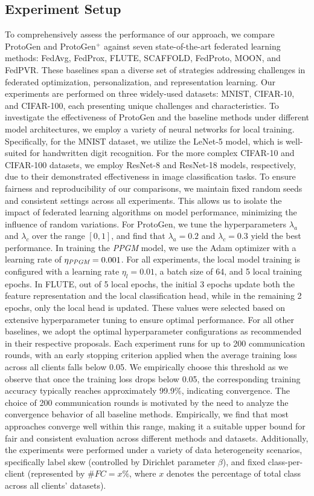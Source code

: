 \documentclass[lettersize,journal]{IEEEtran}
\begin{document}
\subsection{Experiment Setup}

To comprehensively assess the performance of our approach, we compare \textsf{ProtoGen} and \textsf{ProtoGen}$^+$ against seven state-of-the-art federated learning methods: FedAvg, FedProx, FLUTE, SCAFFOLD, FedProto, MOON, and FedPVR. These baselines span a diverse set of strategies addressing challenges in federated optimization, personalization, and representation learning.
Our experiments are performed on three widely-used datasets: MNIST, CIFAR-10, and CIFAR-100, each presenting unique challenges and characteristics. To investigate the effectiveness of \textsf{ProtoGen} and the baseline methods under different model architectures, we employ a variety of neural networks for local training. Specifically, for the MNIST dataset, we utilize the LeNet-5 model, which is well-suited for handwritten digit recognition. For the more complex CIFAR-10 and CIFAR-100 datasets, we employ ResNet-8 and ResNet-18 models, respectively, due to their demonstrated effectiveness in image classification tasks. To ensure fairness and reproducibility of our comparisons, we maintain fixed random seeds and consistent settings across all experiments. This allows us to isolate the impact of federated learning algorithms on model performance, minimizing the influence of random variations. For \textsf{ProtoGen}, we tune the hyperparameters $\lambda_a$ and $\lambda_c$ over the range $[0, 1]$, and find that $\lambda_a = 0.2$ and $\lambda_c = 0.3$ yield the best performance. In training the \emph{PPGM} model, we use the Adam optimizer with a learning rate of $\eta_{\emph{PPGM}} = 0.001$. For all experiments, the local model training is configured with a learning rate $\eta_l = 0.01$, a batch size of 64, and 5 local training epochs. In FLUTE, out of 5 local epochs, the initial 3 epochs update both the feature representation and the local classification head, while in the remaining 2 epochs, only the local head is updated. These values were selected based on extensive hyperparameter tuning to ensure optimal performance. For all other baselines, we adopt the optimal hyperparameter configurations as recommended in their respective proposals.
Each experiment runs for up to 200 communication rounds, with an early stopping criterion applied when the average training loss across all clients falls below 0.05. We empirically choose this threshold as we observe that once the training loss drops below 0.05, the corresponding training accuracy typically reaches approximately 99.9\%, indicating convergence. The choice of 200 communication rounds is motivated by the need to analyze the convergence behavior of all baseline methods. Empirically, we find that most approaches converge well within this range, making it a suitable upper bound for fair and consistent evaluation across different methods and datasets. Additionally, the experiments were performed under a variety of data heterogeneity scenarios, specifically label skew (controlled by Dirichlet \cite{Dirichlet} parameter $\beta$), and fixed class-per-client (represented by $\#FC=x\%$, where $x$ denotes the percentage of total class across all clients' datasets).
\end{document}
